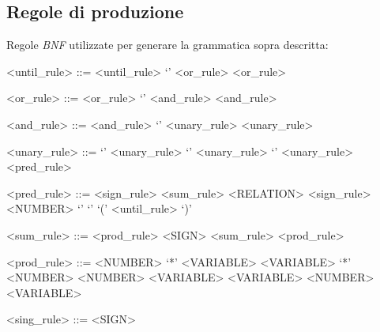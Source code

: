 \documentclass[10pt,a4paper]{article}
\begin{document}
	\subsection{Regole di produzione}
	Regole \emph{BNF} utilizzate per generare la grammatica sopra descritta:
	\setlength{\grammarindent}{7em} 
	\begin{grammar}
	
	<until\_rule> ::= <until\_rule> `\UNTILword[' <NUMBER> `]' <or\_rule> \alt <or\_rule>
	
	<or\_rule> ::= <or\_rule> `\OR' <and\_rule> \alt <and\_rule>
	
	<and\_rule> ::= <and\_rule> `\AND' <unary\_rule> \alt <unary\_rule>
	
	<unary\_rule> ::= `\NOT'  <unary\_rule> \alt `\GLOBALLYword[' <NUMBER> `]' <unary\_rule> \alt  `\FUTUREword[' <NUMBER> `]' <unary\_rule>\alt  <pred\_rule>
	
	<pred\_rule> ::= <sign\_rule> <sum\_rule> <RELATION> <sign\_rule> <NUMBER> \alt `\TRUE' \alt `\FALSE' \alt `(' <until\_rule> `)'
	
	<sum\_rule> ::= <prod\_rule> <SIGN> <sum\_rule> \alt <prod\_rule>
	
	<prod\_rule> ::= <NUMBER> `*' <VARIABLE> \alt  <VARIABLE> `*' <NUMBER> \alt <NUMBER> <VARIABLE> \alt <VARIABLE> <NUMBER> \alt <VARIABLE>
	
	<sing\_rule> ::= <SIGN> \alt <empty string>
	\end{grammar}

	
	
\end{document}

